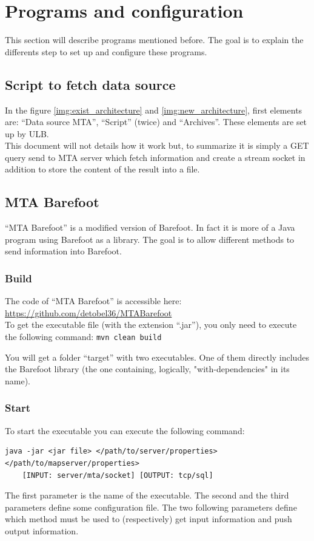 \documentclass[a4paper,12pt]{article}
\begin{document}
        
\section{Programs and configuration}
    This section will describe programs mentioned before. The goal is to explain the differents step to set up and configure these programs.
    
    \subsection{Script to fetch data source}
        \label{subsec:script_fetch_data}
        In the figure \ref{img:exist_architecture} and \ref{img:new_architecture}, first elements are: ``Data source MTA'', ``Script'' (twice) and ``Archives''. These elements are set up by ULB.\\
        This document will not details how it work but, to summarize it is simply a GET query send to MTA server which fetch information and create a stream socket in addition to store the content of the result into a file.
    
    \subsection{MTA Barefoot}
        ``MTA Barefoot'' is a modified version of Barefoot. In fact it is more of a Java program using Barefoot as a library. The goal is to allow different methods to send information into Barefoot.\\
        
        \subsubsection{Build}
            The code of ``MTA Barefoot'' is accessible here: \url{https://github.com/detobel36/MTABarefoot}\\
            To get the executable file (with the extension ``.jar''), you only need to execute the following command: \verb|mvn clean build|
            
            You will get a folder ``target'' with two executables. One of them directly includes the Barefoot library (the one containing, logically, "with-dependencies" in its name).
        
        \subsubsection{Start}
            To start the executable you can execute the following command: 
            \begin{verbatim}
java -jar <jar file> </path/to/server/properties> </path/to/mapserver/properties>
    [INPUT: server/mta/socket] [OUTPUT: tcp/sql]\end{verbatim}
            The first parameter is the name of the executable. The second and the third parameters define some configuration file. The two following parameters define which method must be used to (respectively) get input information and push output information.\\
            
\end{document}
